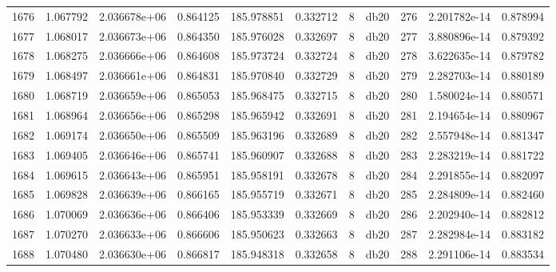 \begin{tabular}{lrrrrrrlrrr}
1676 &    1.067792 &        2.036678e+06 &  0.864125 &              185.978851 &    0.332712 &       8 &         db20 &    276 &   2.201782e-14 &      0.878994 \\
1677 &    1.068017 &        2.036673e+06 &  0.864350 &              185.976028 &    0.332697 &       8 &         db20 &    277 &   3.880896e-14 &      0.879392 \\
1678 &    1.068275 &        2.036666e+06 &  0.864608 &              185.973724 &    0.332724 &       8 &         db20 &    278 &   3.622635e-14 &      0.879782 \\
1679 &    1.068497 &        2.036661e+06 &  0.864831 &              185.970840 &    0.332729 &       8 &         db20 &    279 &   2.282703e-14 &      0.880189 \\
1680 &    1.068719 &        2.036659e+06 &  0.865053 &              185.968475 &    0.332715 &       8 &         db20 &    280 &   1.580024e-14 &      0.880571 \\
1681 &    1.068964 &        2.036656e+06 &  0.865298 &              185.965942 &    0.332691 &       8 &         db20 &    281 &   2.194654e-14 &      0.880967 \\
1682 &    1.069174 &        2.036650e+06 &  0.865509 &              185.963196 &    0.332689 &       8 &         db20 &    282 &   2.557948e-14 &      0.881347 \\
1683 &    1.069405 &        2.036646e+06 &  0.865741 &              185.960907 &    0.332688 &       8 &         db20 &    283 &   2.283219e-14 &      0.881722 \\
1684 &    1.069615 &        2.036643e+06 &  0.865951 &              185.958191 &    0.332678 &       8 &         db20 &    284 &   2.291855e-14 &      0.882097 \\
1685 &    1.069828 &        2.036639e+06 &  0.866165 &              185.955719 &    0.332671 &       8 &         db20 &    285 &   2.284809e-14 &      0.882460 \\
1686 &    1.070069 &        2.036636e+06 &  0.866406 &              185.953339 &    0.332669 &       8 &         db20 &    286 &   2.202940e-14 &      0.882812 \\
1687 &    1.070270 &        2.036633e+06 &  0.866606 &              185.950623 &    0.332663 &       8 &         db20 &    287 &   2.282984e-14 &      0.883182 \\
1688 &    1.070480 &        2.036630e+06 &  0.866817 &              185.948318 &    0.332658 &       8 &         db20 &    288 &   2.291106e-14 &      0.883534 \\

\end{tabular}
